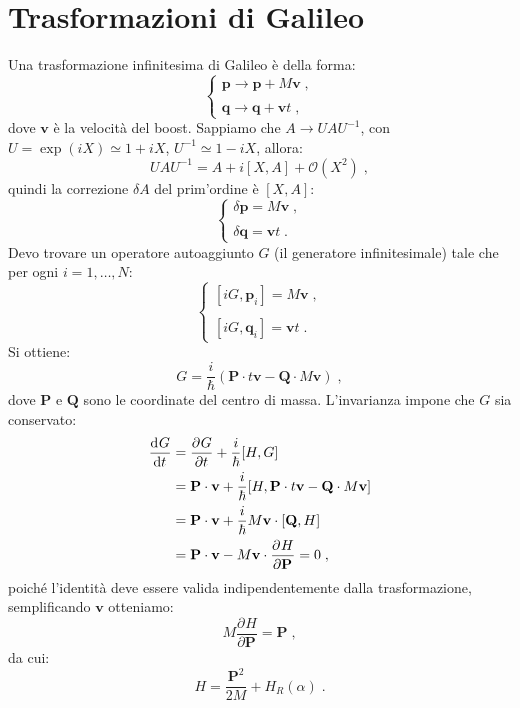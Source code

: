 \documentclass[10pt,a4paper]{report}
\theoremstyle{definition}
\newcommand{\pdev}[3][]{\frac{\partial^{#1} #2}{\partial #3^{#1}}}
\newcommand{\dev}[3][]{\frac{\mathrm{d}^{#1} #2}{\mathrm{d} #3^{#1}}}
\numberwithin{equation}{section}
\begin{document}
\section{Trasformazioni di Galileo}
Una trasformazione infinitesima di Galileo è della forma:
\begin{equation}
\begin{cases}
\mathbf{p}\to \mathbf{p}+M\mathbf{v}\;, \\
\\
\mathbf{q}\to \mathbf{q}+\mathbf{v}t\;,
\end{cases}
\end{equation}
dove $\mathbf{v}$ è la velocità del boost. Sappiamo che $A\to UAU^{-1}$, con $U=\exp(iX)\simeq 1+iX$, $U^{-1}\simeq 1-iX$, allora:
\begin{equation}
UAU^{-1}=A+i[X,A]+\mathcal{O}(X^2)\;,
\end{equation}
quindi la correzione $\delta A$ del prim'ordine è $[X,A]$:
\begin{equation}
\begin{cases}
\delta\mathbf{p}=M\mathbf{v}\;, \\
\\
\delta\mathbf{q}=\mathbf{v}t\;.
\end{cases}
\end{equation}
Devo trovare un operatore autoaggiunto $G$ (il generatore infinitesimale) tale che per ogni $i=1,\ldots,N$:
\begin{equation}
\begin{cases}
[iG,\mathbf{p}_i]=M\mathbf{v}\;, \\
\\
[iG,\mathbf{q}_i]=\mathbf{v}t\;.
\end{cases}
\end{equation}
Si ottiene:
\begin{equation}
G=\frac{i}{\hbar}(\mathbf{P}\cdot t\mathbf{v}-\mathbf{Q}\cdot M\mathbf{v})\;,
\end{equation}
dove $\mathbf{P}$ e $\mathbf{Q}$ sono le coordinate del centro di massa. L'invarianza impone che $G$ sia conservato:
\begin{align}
\dev{G}{t} &=\pdev{G}{t}+\frac{i}{\hbar}[H,G] \notag \\
&= \mathbf{P}\cdot \mathbf{v}+\frac{i}{\hbar}[H,\mathbf{P}\cdot t\mathbf{v}-\mathbf{Q}\cdot M\mathbf{v}] \notag \\
&= \mathbf{P}\cdot \mathbf{v}+\frac{i}{\hbar}M\mathbf{v}\cdot [\mathbf{Q},H] \notag \\
&= \mathbf{P}\cdot \mathbf{v}-M\mathbf{v}\cdot \pdev{H}{\mathbf{P}}=0\;,
\end{align}
poiché l'identità deve essere valida indipendentemente dalla trasformazione, semplificando $\mathbf{v}$ otteniamo:
\begin{equation}
M\pdev{H}{\mathbf{P}}=\mathbf{P}\;,
\end{equation}
da cui:
\begin{equation}
H=\frac{\mathbf{P}^2}{2M}+H_R(\alpha)\;.
\end{equation}
\end{document}
